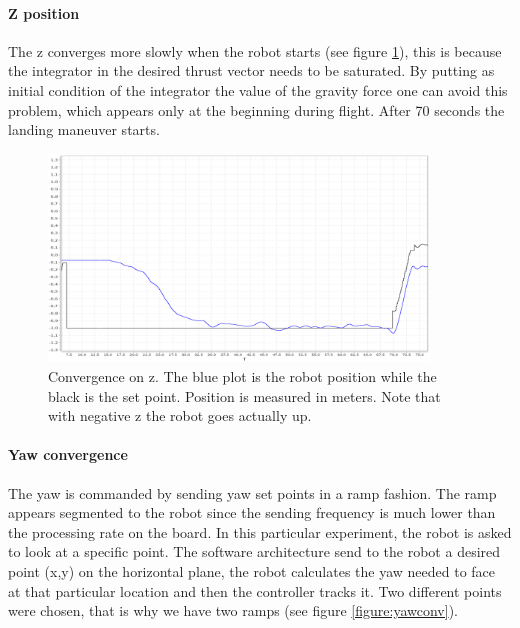 \paragraph{Z position} The z converges more slowly when the robot starts (see figure \ref{figure:zconv}), this is because the integrator in the desired thrust vector needs to be saturated. By putting as initial condition of the integrator the value of the gravity force one can avoid this problem, which appears only at the beginning during flight. After 70 seconds the landing maneuver starts.

\begin{figure}[H]
	\centering
	\noindent
	\includegraphics[width=0.9\textwidth]{z_conv.png}
	\caption[Convergence on z]{Convergence on z. The blue plot is the robot position while the black is the set point. Position is measured in meters. Note that with negative z the robot goes actually up.}
	\label{figure:zconv}
\end{figure}


\paragraph{Yaw convergence} The yaw is commanded by sending yaw set points in a ramp fashion. The ramp appears segmented to the robot since the sending frequency is much lower than the processing rate on the board. In this particular experiment, the robot is asked to look at a specific point. The software architecture send to the robot a desired point (x,y) on the horizontal plane, the robot calculates the yaw needed to face at that particular location and then the controller tracks it. Two different points were chosen, that is why we have two ramps (see figure \ref{figure:yawconv}).

